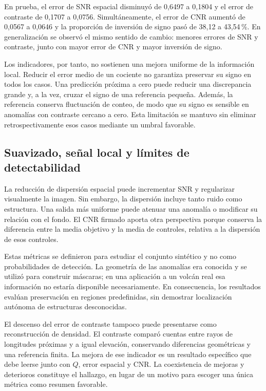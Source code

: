 En prueba, el error de SNR espacial disminuyó de 0,6497 a 0,1804 y el error de contraste de 0,1707 a 0,0756. Simultáneamente, el error de CNR aumentó de 0,0567 a 0,0646 y la proporción de inversión de signo pasó de 38,12 a 43,54\,\%. En generalización se observó el mismo sentido de cambio: menores errores de SNR y contraste, junto con mayor error de CNR y mayor inversión de signo.

Los indicadores, por tanto, no sostienen una mejora uniforme de la información local. Reducir el error medio de un cociente no garantiza preservar su signo en todos los casos. Una predicción próxima a cero puede reducir una discrepancia grande y, a la vez, cruzar el signo de una referencia pequeña. Además, la referencia conserva fluctuación de conteo, de modo que su signo es sensible en anomalías con contraste cercano a cero. Esta limitación se mantuvo sin eliminar retrospectivamente esos casos mediante un umbral favorable.

\subsection{Suavizado, señal local y límites de detectabilidad}
La reducción de dispersión espacial puede incrementar SNR y regularizar visualmente la imagen. Sin embargo, la dispersión incluye tanto ruido como estructura. Una salida más uniforme puede atenuar una anomalía o modificar su relación con el fondo. El CNR firmado aporta otra perspectiva porque conserva la diferencia entre la media objetivo y la media de controles, relativa a la dispersión de esos controles.

Estas métricas se definieron para estudiar el conjunto sintético y no como probabilidades de detección. La geometría de las anomalías era conocida y se utilizó para construir máscaras; en una aplicación a un volcán real esa información no estaría disponible necesariamente. En consecuencia, los resultados evalúan preservación en regiones predefinidas, sin demostrar localización autónoma de estructuras desconocidas.

El descenso del error de contraste tampoco puede presentarse como reconstrucción de densidad. El contraste comparó cuentas entre rayos de longitudes próximas y a igual elevación, conservando diferencias geométricas y una referencia finita. La mejora de ese indicador es un resultado específico que debe leerse junto con $Q$, error espacial y CNR. La coexistencia de mejoras y deterioros constituye el hallazgo, en lugar de un motivo para escoger una única métrica como resumen favorable.

